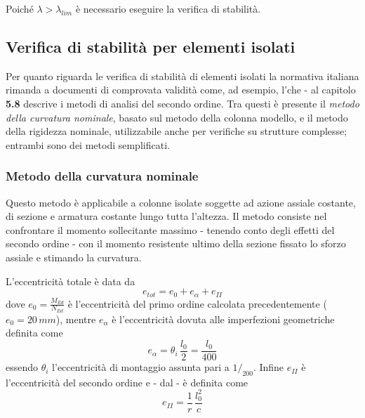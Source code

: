 Poiché $\lambda > \lambda_{lim}$ è necessario eseguire la verifica di stabilità.

\subsection{Verifica di stabilità per elementi isolati}
Per quanto riguarda le verifica di stabilità di elementi isolati la normativa italiana rimanda a documenti di comprovata validità come, ad esempio, l'\ec che - al capitolo \textbf{5.8} descrive i metodi di analisi del secondo ordine. Tra questi è presente il \textit{metodo della curvatura nominale}, basato sul metodo della colonna modello, e il metodo della rigidezza nominale, utilizzabile anche per verifiche su strutture complesse; entrambi sono dei metodi semplificati.

\subsubsection{Metodo della curvatura nominale}
Questo metodo è applicabile a colonne isolate soggette ad azione assiale costante, di sezione e armatura costante lungo tutta l'altezza. Il metodo consiste nel confrontare il momento sollecitante massimo - tenendo conto degli effetti del secondo ordine - con il momento resistente ultimo della sezione fissato lo sforzo assiale e stimando la curvatura. 

L'eccentricità totale è data da
\begin{equation}
	\label{eq:e_tot}
e_{tot} = e_0 + e_\alpha + e_{II}
\end{equation}
dove $e_0=\frac{M_{Ed}}{N_{Ed}}$ è l'eccentricità del primo ordine calcolata precedentemente ($e_0 = 20\,mm$), mentre $e_\alpha$ è l'eccentricità dovuta alle imperfezioni geometriche definita come 
\begin{equation}
    \label{eq:e_alpha}
	e_\alpha = \theta_i\,\dfrac{l_0}{2} = \dfrac{l_0}{400}
\end{equation}
essendo $\theta_i$ l'eccentricità di montaggio assunta pari a $1/_{200}$. Infine $e_{II}$ è l'eccentricità del secondo ordine e - dal \ec - è definita come
\begin{equation}
	\label{eq:e_II}
e_{II} = \dfrac{1}{r}\,\dfrac{l_0^2}{c}
\end{equation}

